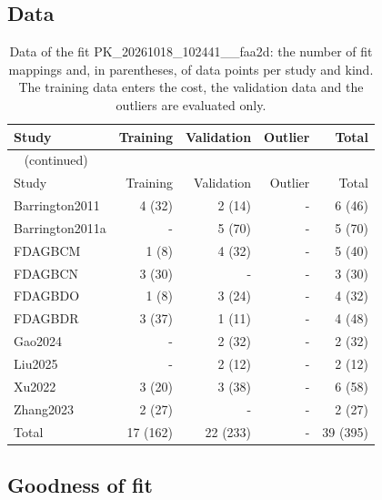 \documentclass{article}
\begin{document}
\subsection{Data}

\begin{longtable}{lrrrr}
\caption{Data of the fit PK\_20261018\_102441\_\_faa2d: the number of fit mappings and, in parentheses, of data points per study and kind. The training data enters the cost, the validation data and the outliers are evaluated only.}\label{tab:data:PK_20261018_102441__faa2d} \\
\toprule
Study & Training & Validation & Outlier & Total \\
\midrule
\endfirsthead
\multicolumn{5}{l}{\small\tablename~\thetable{} (continued)} \\
\toprule
Study & Training & Validation & Outlier & Total \\
\midrule
\endhead
\bottomrule
\endlastfoot
Barrington2011 & 4 (32) & 2 (14) & - & 6 (46) \\
Barrington2011a & - & 5 (70) & - & 5 (70) \\
FDAGBCM & 1 (8) & 4 (32) & - & 5 (40) \\
FDAGBCN & 3 (30) & - & - & 3 (30) \\
FDAGBDO & 1 (8) & 3 (24) & - & 4 (32) \\
FDAGBDR & 3 (37) & 1 (11) & - & 4 (48) \\
Gao2024 & - & 2 (32) & - & 2 (32) \\
Liu2025 & - & 2 (12) & - & 2 (12) \\
Xu2022 & 3 (20) & 3 (38) & - & 6 (58) \\
Zhang2023 & 2 (27) & - & - & 2 (27) \\
Total & 17 (162) & 22 (233) & - & 39 (395) \\
\end{longtable}

\subsection{Goodness of fit}
\end{document}
